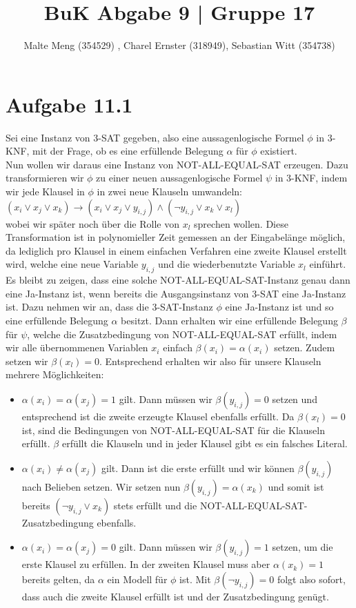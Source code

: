 \documentclass{article}
\title{BuK Abgabe 9 | Gruppe 17}
\author{Malte Meng (354529) , Charel Ernster (318949), Sebastian Witt (354738)}
\begin{document}
	\maketitle 
\section{Aufgabe 11.1}
Sei eine Instanz von 3-SAT gegeben, also eine aussagenlogische Formel $\phi$ in 3-KNF, mit der Frage, ob es eine erfüllende Belegung $\alpha$ für $\phi$ existiert.\\
Nun wollen wir daraus eine Instanz von NOT-ALL-EQUAL-SAT erzeugen. Dazu transformieren wir $\phi$ zu einer neuen aussagenlogische Formel $\psi$ in 3-KNF, indem wir jede Klausel in $\phi$ in zwei neue Klauseln umwandeln:\\

$(x_i \lor x_j \lor x_k) \rightarrow (x_i \lor x_j \lor y_{i,j}) \land (\lnot y_{i,j} \lor x_k \lor x_l)$\\

wobei wir später noch über die Rolle von $x_l$ sprechen wollen. Diese Transformation ist in polynomieller Zeit gemessen an der Eingabelänge möglich, da lediglich pro Klausel in einem einfachen Verfahren eine zweite Klausel erstellt wird, welche eine neue Variable $y_{i,j}$ und die wiederbenutzte Variable $x_l$ einführt.\\
Es bleibt zu zeigen, dass eine solche NOT-ALL-EQUAL-SAT-Instanz genau dann eine Ja-Instanz ist, wenn bereits die Ausgangsinstanz von 3-SAT eine Ja-Instanz ist. Dazu nehmen wir an, dass die 3-SAT-Instanz $\phi$ eine Ja-Instanz ist und so eine erfüllende Belegung $\alpha$ besitzt. Dann erhalten wir eine erfüllende Belegung $\beta$ für $\psi$, welche die Zusatzbedingung von NOT-ALL-EQUAL-SAT erfüllt, indem wir alle übernommenen Variablen $x_i$ einfach $\beta (x_i) = \alpha (x_i)$ setzen. Zudem setzen wir $\beta (x_l)=0$. Entsprechend erhalten wir also für unsere Klauseln mehrere Möglichkeiten:\\

\begin{itemize}
\item $\alpha(x_i)=\alpha(x_j)=1$ gilt. Dann müssen wir $\beta(y_{i,j})=0$ setzen und entsprechend ist die zweite erzeugte Klausel ebenfalls erfüllt. Da $\beta(x_l)=0$ ist, sind die Bedingungen von NOT-ALL-EQUAL-SAT für die Klauseln erfüllt. $\beta$ erfüllt die Klauseln und in jeder Klausel gibt es ein falsches Literal.
\item $\alpha(x_i)\neq \alpha(x_j)$ gilt. Dann ist die erste erfüllt und wir können $\beta(y_{i,j})$ nach Belieben setzen. Wir setzen nun $\beta(y_{i,j}) = \alpha(x_k)$ und somit ist bereits $(\lnot y_{i,j} \lor x_k)$ stets erfüllt und die NOT-ALL-EQUAL-SAT-Zusatzbedingung ebenfalls.
\item $\alpha(x_i)=\alpha(x_j)=0$ gilt. Dann müssen wir $\beta (y_{i,j})=1$ setzen, um die erste Klausel zu erfüllen. In der zweiten Klausel muss aber $\alpha(x_k)=1$ bereits gelten, da $\alpha$ ein Modell für $\phi$ ist. Mit $\beta (\lnot y_{i,j})=0$ folgt also sofort, dass auch die zweite Klausel erfüllt ist und der Zusatzbedingung genügt.
\end{itemize}
\end{document}
